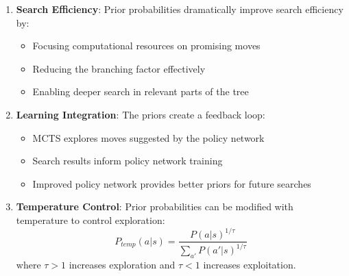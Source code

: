\begin{itemize}
\begin{enumerate}
        \item \textbf{Search Efficiency}: Prior probabilities dramatically improve search efficiency by:
        \begin{itemize}
            \item Focusing computational resources on promising moves
            \item Reducing the branching factor effectively
            \item Enabling deeper search in relevant parts of the tree
        \end{itemize}
        
        \item \textbf{Learning Integration}: The priors create a feedback loop:
        \begin{itemize}
            \item MCTS explores moves suggested by the policy network
            \item Search results inform policy network training
            \item Improved policy network provides better priors for future searches
        \end{itemize}
        
        \item \textbf{Temperature Control}: Prior probabilities can be modified with temperature to control exploration:
        \[P_{temp}(a|s) = \frac{P(a|s)^{1/\tau}}{\sum_{a'} P(a'|s)^{1/\tau}}\]
        where $\tau > 1$ increases exploration and $\tau < 1$ increases exploitation.
    \end{enumerate}
\end{itemize}



